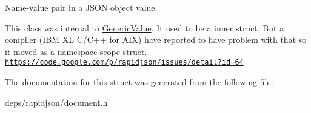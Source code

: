 Name-\/value pair in a J\+S\+ON object value. 

This class was internal to \hyperlink{class_generic_value}{Generic\+Value}. It used to be a inner struct. But a compiler (I\+BM XL C/\+C++ for A\+IX) have reported to have problem with that so it moved as a namespace scope struct. \href{https://code.google.com/p/rapidjson/issues/detail?id=64}{\tt https\+://code.\+google.\+com/p/rapidjson/issues/detail?id=64} 

The documentation for this struct was generated from the following file\+:\begin{DoxyCompactItemize}
\item 
deps/rapidjson/document.\+h\end{DoxyCompactItemize}
